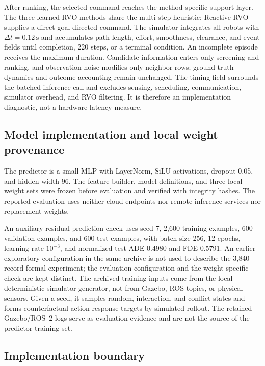 \documentclass[pdflatex,sn-mathphys-num]{sn-jnl}
\begin{document}
After ranking, the selected command reaches the method-specific support layer. The three learned RVO methods share the multi-step heuristic; Reactive RVO supplies a direct goal-directed command. The simulator integrates all robots with $\Delta t=0.12\,\mathrm{s}$ and accumulates path length, effort, smoothness, clearance, and event fields until completion, 220 steps, or a terminal condition. An incomplete episode receives the maximum duration. Candidate information enters only screening and ranking, and observation noise modifies only neighbor rows; ground-truth dynamics and outcome accounting remain unchanged. The timing field surrounds the batched inference call and excludes sensing, scheduling, communication, simulator overhead, and RVO filtering. It is therefore an implementation diagnostic, not a hardware latency measure.

\subsection{Model implementation and local weight provenance}

The predictor is a small MLP with LayerNorm, SiLU activations, dropout 0.05, and hidden width 96. The feature builder, model definitions, and three local weight sets were frozen before evaluation and verified with integrity hashes. The reported evaluation uses neither cloud endpoints nor remote inference services nor replacement weights.

An auxiliary residual-prediction check uses seed 7, 2,600 training examples, 600 validation examples, and 600 test examples, with batch size 256, 12 epochs, learning rate $10^{-3}$, and normalized test ADE 0.4980 and FDE 0.5791. An earlier exploratory configuration in the same archive is not used to describe the 3,840-record formal experiment; the evaluation configuration and the weight-specific check are kept distinct.
The archived training inputs come from the local deterministic simulator generator, not from Gazebo, ROS topics, or physical sensors. Given a seed, it samples random, interaction, and conflict states and forms counterfactual action-response targets by simulated rollout. The retained Gazebo/ROS~2 logs serve as evaluation evidence and are not the source of the predictor training set.

\subsection{Implementation boundary}
\end{document}
